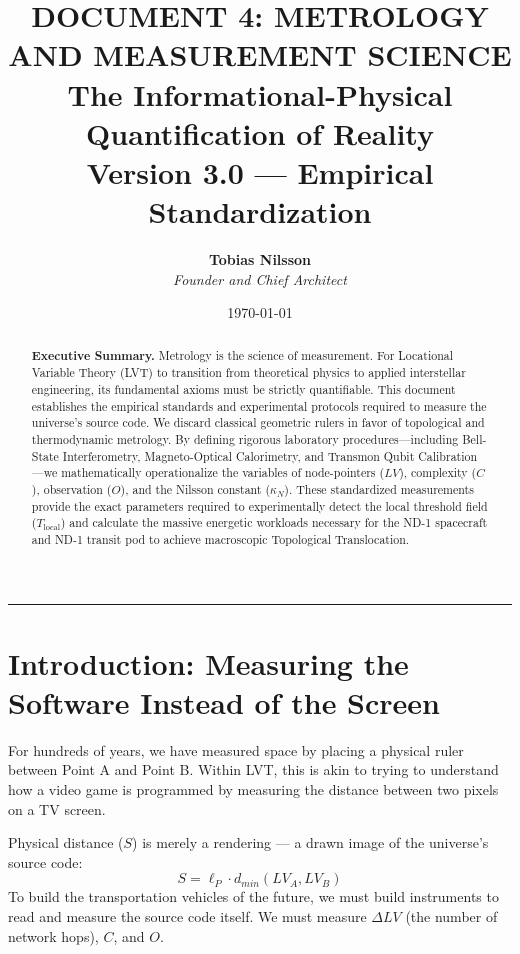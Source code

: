 \documentclass[12pt,a4paper]{article}
\title{\Huge
\textbf{DOCUMENT 4: METROLOGY AND MEASUREMENT SCIENCE} \\ \large The Informational-Physical Quantification of Reality \\[0.5em]
\normalsize Version 3.0 --- Empirical Standardization}
\author{\textbf{Tobias Nilsson} \\ \textit{Founder and Chief Architect}}
\date{\today}
\begin{document}
\maketitle

\vspace{-1em}
\begin{abstract}
\noindent
\textbf{Executive Summary.} Metrology is the science of measurement. For Locational Variable Theory (LVT) to transition from theoretical physics to applied interstellar engineering, its fundamental axioms must be strictly quantifiable. This document establishes the empirical standards and experimental protocols required to measure the universe's source code. We discard classical geometric rulers in favor of topological and thermodynamic metrology. By defining rigorous laboratory procedures—including Bell-State Interferometry, Magneto-Optical Calorimetry, and Transmon Qubit Calibration—we mathematically operationalize the variables of node-pointers ($LV$), complexity ($C$), observation ($O$), and the Nilsson constant ($\kappa_N$). These standardized measurements provide the exact parameters required to experimentally detect the local threshold field ($T_{\mathrm{local}}$) and calculate the massive energetic workloads necessary for the ND-1 spacecraft and ND-1 transit pod to achieve macroscopic Topological Translocation.
\end{abstract}


\vspace{1em}
\hrule
\vspace{1em}

\tableofcontents
\clearpage

\section{Introduction: Measuring the Software Instead of the Screen}

For hundreds of years, we have measured space by placing a physical ruler between Point A and Point B. Within LVT, this is akin to trying to understand how a video game is programmed by measuring the distance between two pixels on a TV screen.

Physical distance ($S$) is merely a rendering --- a drawn image of the universe's source code:
\begin{equation}
S = \ell_P \cdot d_{min}(LV_A, LV_B)
\end{equation}
To build the transportation vehicles of the future, we must build instruments to read and measure the source code itself. We must measure $\Delta LV$ (the number of network hops), $C$, and $O$.
\end{document}

